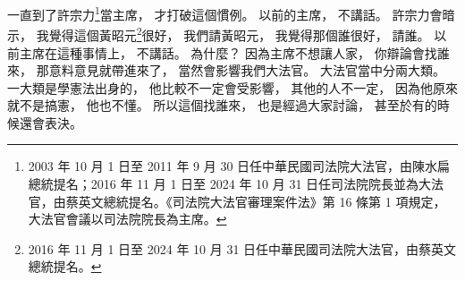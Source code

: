 \hypertarget{w01:cue:1124}{}一直到了許宗力\footnote{2003 年 10 月 1 日至 2011 年 9 月 30 日任中華民國司法院大法官，由陳水扁總統提名；2016 年 11 月 1 日至 2024 年 10 月 31 日任司法院院長並為大法官，由蔡英文總統提名。《司法院大法官審理案件法》第 16 條第 1 項規定，大法官會議以司法院院長為主席。}當主席，
\hypertarget{w01:cue:1125}{}才打破這個慣例。
\hypertarget{w01:cue:1126}{}以前的主席，
\hypertarget{w01:cue:1127}{}不講話。
\hypertarget{w01:cue:1128}{}許宗力會暗示，
\hypertarget{w01:cue:1129}{}我覺得這個黃昭元\footnote{2016 年 11 月 1 日至 2024 年 10 月 31 日任中華民國司法院大法官，由蔡英文總統提名。}很好，
\hypertarget{w01:cue:1130}{}我們請黃昭元，
\hypertarget{w01:cue:1131}{}我覺得那個誰很好，
\hypertarget{w01:cue:1132}{}請誰。
\hypertarget{w01:cue:1133}{}以前主席在這種事情上，
\hypertarget{w01:cue:1134}{}不講話。
\hypertarget{w01:cue:1135}{}為什麼？
\hypertarget{w01:cue:1136}{}因為主席不想讓人家，
\hypertarget{w01:cue:1137}{}你辯論會找誰來，
\hypertarget{w01:cue:1138}{}那意料意見就帶進來了，
\hypertarget{w01:cue:1139}{}當然會影響我們大法官。
\hypertarget{w01:cue:1140}{}大法官當中分兩大類。
\hypertarget{w01:cue:1141}{}一大類是學憲法出身的，
\hypertarget{w01:cue:1142}{}他比較不一定會受影響，
\hypertarget{w01:cue:1143}{}其他的人不一定，
\hypertarget{w01:cue:1144}{}因為他原來就不是搞憲，
\hypertarget{w01:cue:1145}{}他也不懂。
\hypertarget{w01:cue:1146}{}所以這個找誰來，
\hypertarget{w01:cue:1147}{}也是經過大家討論，
\hypertarget{w01:cue:1148}{}甚至於有的時候還會表決。

